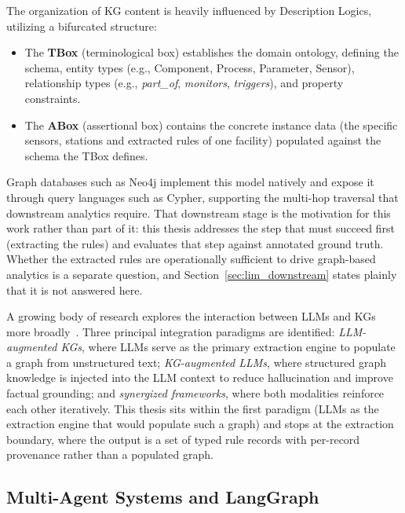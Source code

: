 \documentclass[11pt]{article}
\begin{document}
The organization of KG content is heavily influenced by Description Logics, utilizing a bifurcated structure:
\begin{itemize}
    \item The \textbf{TBox} (terminological box) establishes the domain ontology, defining the schema, entity types (e.g., Component, Process, Parameter, Sensor), relationship types (e.g., \textit{part\_of}, \textit{monitors}, \textit{triggers}), and property constraints.
    \item The \textbf{ABox} (assertional box) contains the concrete instance data (the specific sensors, stations and extracted rules of one facility) populated against the schema the TBox defines.
\end{itemize}

Graph databases such as Neo4j implement this model natively and expose it through query languages such as Cypher, supporting the multi-hop traversal that downstream analytics require. That downstream stage is the motivation for this work rather than part of it: this thesis addresses the step that must succeed first (extracting the rules) and evaluates that step against annotated ground truth. Whether the extracted rules are operationally sufficient to drive graph-based analytics is a separate question, and Section~\ref{sec:lim_downstream} states plainly that it is not answered here.

A growing body of research explores the interaction between LLMs and KGs more broadly~\cite{pan2024unifying}. Three principal integration paradigms are identified: \emph{LLM-augmented KGs}, where LLMs serve as the primary extraction engine to populate a graph from unstructured text; \emph{KG-augmented LLMs}, where structured graph knowledge is injected into the LLM context to reduce hallucination and improve factual grounding; and \emph{synergized frameworks}, where both modalities reinforce each other iteratively. This thesis sits within the first paradigm (LLMs as the extraction engine that would populate such a graph) and stops at the extraction boundary, where the output is a set of typed rule records with per-record provenance rather than a populated graph.

\subsection{Multi-Agent Systems and LangGraph}
\label{sec:bg_mas}
\end{document}
